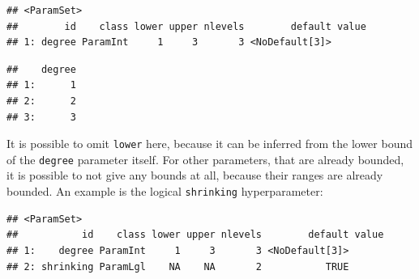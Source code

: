 \documentclass[
]{scrbook}
\newenvironment{Shaded}{\begin{snugshade}}{\end{snugshade}}
\newcommand{\DecValTok}[1]{\textcolor[rgb]{0.00,0.00,0.81}{#1}}
\newcommand{\FunctionTok}[1]{\textcolor[rgb]{0.00,0.00,0.00}{#1}}
\newcommand{\NormalTok}[1]{#1}
\newcommand{\OtherTok}[1]{\textcolor[rgb]{0.56,0.35,0.01}{#1}}
\newcommand{\SpecialCharTok}[1]{\textcolor[rgb]{0.00,0.00,0.00}{#1}}
\renewenvironment{Shaded} {\begin{snugshade}\small} {\end{snugshade}}
\begin{document}
\begin{verbatim}
## <ParamSet>
##        id    class lower upper nlevels        default value
## 1: degree ParamInt     1     3       3 <NoDefault[3]>
\end{verbatim}

\begin{Shaded}
\end{Shaded}

\begin{verbatim}
##    degree
## 1:      1
## 2:      2
## 3:      3
\end{verbatim}

It is possible to omit \texttt{lower} here, because it can be inferred from the lower bound of the \texttt{degree} parameter itself.
For other parameters, that are already bounded, it is possible to not give any bounds at all, because their ranges are already bounded.
An example is the logical \texttt{shrinking} hyperparameter:

\begin{Shaded}
\end{Shaded}

\begin{verbatim}
## <ParamSet>
##           id    class lower upper nlevels        default value
## 1:    degree ParamInt     1     3       3 <NoDefault[3]>      
## 2: shrinking ParamLgl    NA    NA       2           TRUE
\end{verbatim}

\begin{Shaded}
\end{Shaded}
\end{document}
